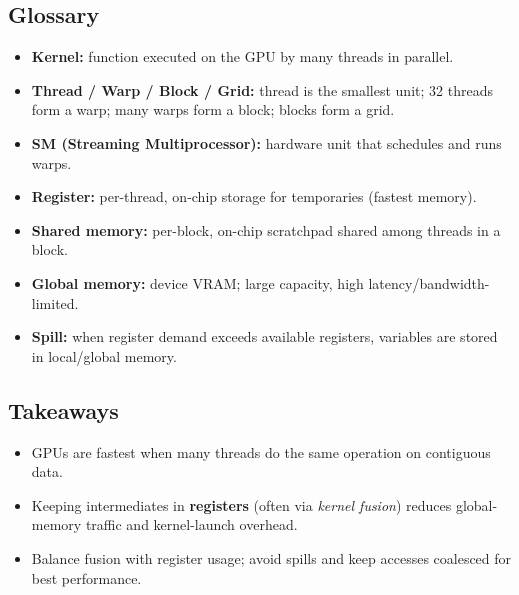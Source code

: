 \subsection{Glossary}
\begin{itemize}
\item \textbf{Kernel:} function executed on the GPU by many threads in parallel.
\item \textbf{Thread / Warp / Block / Grid:} thread is the smallest unit; 32 threads form a warp; many warps form a block; blocks form a grid.
\item \textbf{SM (Streaming Multiprocessor):} hardware unit that schedules and runs warps.
\item \textbf{Register:} per-thread, on-chip storage for temporaries (fastest memory).
\item \textbf{Shared memory:} per-block, on-chip scratchpad shared among threads in a block.
\item \textbf{Global memory:} device VRAM; large capacity, high latency/bandwidth-limited.
\item \textbf{Spill:} when register demand exceeds available registers, variables are stored in local/global memory.
\end{itemize}

\subsection{Takeaways}
\begin{itemize}
\item GPUs are fastest when many threads do the same operation on contiguous data.
\item Keeping intermediates in \textbf{registers} (often via \emph{kernel fusion}) reduces global-memory traffic and kernel-launch overhead.
\item Balance fusion with register usage; avoid spills and keep accesses coalesced for best performance.
\end{itemize}
